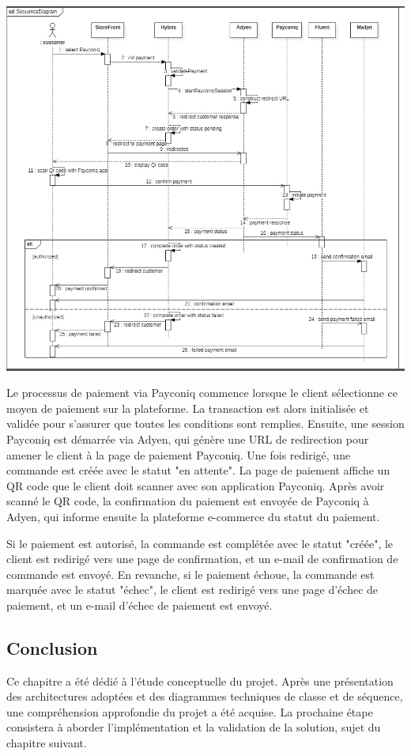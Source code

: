 \begin{center}
    \centering
    \includegraphics[width=19cm]{Figures/sequence.png}
    \label{fig:processus}
\end{center} 


Le processus de paiement via Payconiq commence lorsque le client sélectionne ce moyen de paiement sur la plateforme. La transaction est alors initialisée et validée pour s'assurer que toutes les conditions sont remplies. Ensuite, une session Payconiq est démarrée via Adyen, qui génère une URL de redirection pour amener le client à la page de paiement Payconiq. Une fois redirigé, une commande est créée avec le statut "en attente". La page de paiement affiche un QR code que le client doit scanner avec son application Payconiq. Après avoir scanné le QR code, la confirmation du paiement est envoyée de Payconiq à Adyen, qui informe ensuite la plateforme e-commerce du statut du paiement.

Si le paiement est autorisé, la commande est complétée avec le statut "créée", le client est redirigé vers une page de confirmation, et un e-mail de confirmation de commande est envoyé. En revanche, si le paiement échoue, la commande est marquée avec le statut "échec", le client est redirigé vers une page d'échec de paiement, et un e-mail d'échec de paiement est envoyé.



\subsection*{Conclusion}

Ce chapitre a été dédié à l’étude conceptuelle du projet. Après une présentation des architectures adoptées et des diagrammes techniques de classe et de séquence, une compréhension approfondie du projet a été acquise. La prochaine étape consistera à aborder l’implémentation et la validation de la solution, sujet du chapitre suivant.
\pagebreak